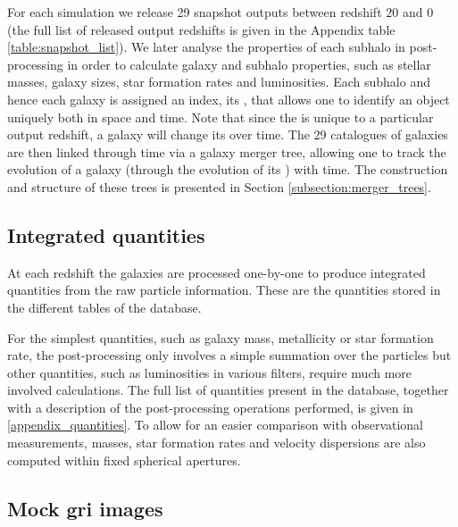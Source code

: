 For each simulation we release 29 snapshot outputs between redshift $20$ and $0$
(the full list of released output redshifts is given in the Appendix table
\ref{table:snapshot_list}). We later analyse the properties of each subhalo in
post-processing in order to calculate galaxy and subhalo properties, such as
stellar masses, galaxy sizes, star formation rates and luminosities. Each
subhalo and hence each galaxy is assigned an index, its \HaloID, that allows one
to identify an object uniquely both in space and time. Note that since the
\HaloID is unique to a particular output redshift, a galaxy will change its
\HaloID over time. The 29 catalogues of galaxies are then linked through time
via a galaxy merger tree, allowing one to track the evolution of a galaxy
(through the evolution of its \HaloID) with time.  The construction and
structure of these trees is presented in Section \ref{subsection:merger_trees}.

\subsection{Integrated quantities}
At each redshift the galaxies are processed one-by-one to produce integrated
quantities from the raw particle information. These are the quantities stored in
the different tables of the database.

For the simplest quantities, such as galaxy mass, metallicity or star formation
rate, the post-processing only involves a simple summation over the particles
but other quantities, such as luminosities in various filters, require much more
involved calculations. The full list of quantities present in the database,
together with a description of the post-processing operations performed, is
given in \ref{appendix_quantities}. To allow for an easier comparison with
observational measurements, masses, star formation rates and velocity
dispersions are also computed within fixed spherical apertures.

\subsection{Mock gri images}

